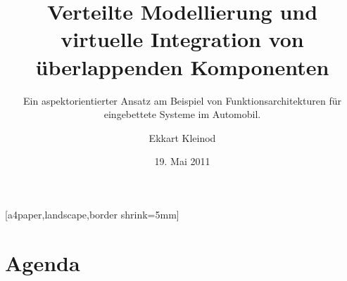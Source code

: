  {


	
	\usepackage{helvet}

}

 {
	\usepackage{pgfpages}
	[a4paper,landscape,border shrink=5mm]
}

\usepackage[ngerman]{babel}
\usepackage[utf8]{inputenc}
\usepackage[T1]{fontenc}

\title[Dissertation]{Verteilte Modellierung und virtuelle Integration von überlappenden Komponenten}

\subtitle{Ein aspektorientierter Ansatz am Beispiel von Funktionsarchitekturen für eingebettete Systeme im Automobil.}

\author{Ekkart Kleinod}
\date{19. Mai 2011}


\subject{AO, eingebettete Systeme, Architekturmodellierung}






	 {
		\maketitle
	}

	\begin{frame}
		\titlepage
	\end{frame}

	\section*{Agenda}


